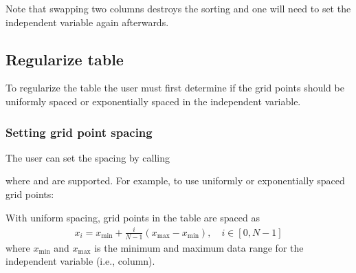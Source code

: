 \documentclass[letterpaper,10pt,english]{sphinxmanual}
\begin{document}
\sphinxAtStartPar
Note that swapping two columns destroys the sorting and one will need to set the independent variable again afterwards.


\subsection{Regularize table}
\label{\detokenize{Utilities/LookupTable:regularize-table}}
\sphinxAtStartPar
To regularize the table the user must first determine if the grid points should be uniformly spaced or exponentially spaced in the independent variable.


\subsubsection{Setting grid point spacing}
\label{\detokenize{Utilities/LookupTable:setting-grid-point-spacing}}
\sphinxAtStartPar
The user can set the spacing by calling

\begin{sphinxVerbatim}[commandchars=\\\{\},formatcom=\scriptsize]
   
\end{sphinxVerbatim}

\sphinxAtStartPar
where  and  are supported.
For example, to use uniformly or exponentially spaced grid points:

\begin{sphinxVerbatim}[commandchars=\\\{\},formatcom=\scriptsize]
 

     
 
\end{sphinxVerbatim}

\sphinxAtStartPar
{}

\sphinxAtStartPar
With uniform spacing, grid points in the table are spaced as
\begin{equation*}
\begin{split}x_i = x_{\textrm{min}} + \frac{i}{N-1}\left(x_{\textrm{max}} - x_{\textrm{min}}\right),\quad i\in[0,N-1]\end{split}
\end{equation*}
\sphinxAtStartPar
where \(x_{\textrm{min}}\) and \(x_{\textrm{max}}\) is the minimum and maximum data range for the independent variable (i.e., column).
\end{document}
